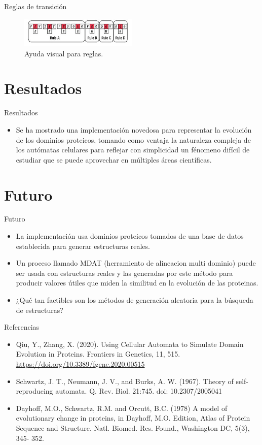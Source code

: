\documentclass{beamer}
\begin{document}
\begin{frame}{Reglas de transición}
\begin{figure}[ht]
\centering
\includegraphics[width=0.5\textwidth]{assets/reglas.jpg}
\caption{Ayuda visual para reglas.}
\label{fig:reglas.jpg}
\end{figure}
\end{frame}

\section{Resultados}
\begin{frame}{Resultados}
\begin{itemize}
\item Se ha mostrado una implementación novedosa para representar la evolución de los dominios proteicos, tomando como ventaja la naturaleza compleja de los autómatas celulares para reflejar con simplicidad un fénomeno difícil de estudiar que se puede aprovechar en múltiples áreas científicas.
\end{itemize}
\end{frame}

\section{Futuro}
\begin{frame}{Futuro}
\begin{itemize}
\item La implementación usa dominios proteicos tomados de una base de datos establecida para generar estructuras reales.
\item Un proceso llamado MDAT (herramiento de alineacion multi dominio) puede ser usada con estructuras reales y las generadas por este método para producir valores útiles que miden la similitud en la evolución de las proteinas.
\item ¿Qué tan factibles son los métodos de generación aleatoria para la búsqueda de estructuras?
\end{itemize}
\end{frame}


\begin{frame}{Referencias}
\begin{itemize}
    \item Qiu, Y., Zhang, X. (2020). Using Cellular Automata to Simulate Domain Evolution in Proteins. Frontiers in Genetics, 11, 515. \url{https://doi.org/10.3389/fgene.2020.00515}
    \item Schwartz, J. T., Neumann, J. V., and Burks, A. W. (1967). Theory of self-reproducing automata. Q. Rev. Biol. 21:745. doi: 10.2307/2005041
    \item Dayhoff, M.O., Schwartz, R.M. and Orcutt, B.C. (1978) A model of evolutionary change in proteins, in Dayhoff, M.O. Edition, Atlas of Protein Sequence and Structure. Natl. Biomed. Res. Found., Washington DC, 5(3), 345- 352.
\end{itemize}
\end{frame}
\end{document}
